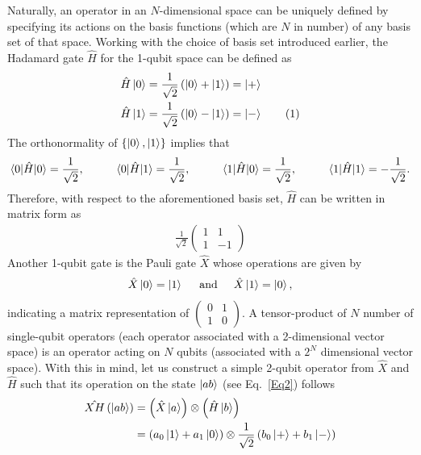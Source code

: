 \documentclass[12pt,oneside]{book}
\newcommand\numberthis{\addtocounter{equation}{1}\tag{\theequation}}
\begin{document}
Naturally, an operator in an $N$-dimensional space can be uniquely defined by specifying its actions on the basis functions (which are $N$ in number) of any basis set of that space. Working with the choice of basis set introduced earlier, the Hadamard gate $\hat{H}$ for the 1-qubit space can be defined as
\begin{align*}\label{Hadamard}
    \hat{H}\ket{0} &{}= \frac{1}{\sqrt{2}}\left(\ket{0}+\ket{1}\right) = \ket{+}\\
    \hat{H}\ket{1} &{}= \frac{1}{\sqrt{2}}\left(\ket{0}-\ket{1}\right) = \ket{-}\numberthis
\end{align*}
The orthonormality of $\{\ket{0},\ket{1}\}$ implies that
\begin{align*}
    \braket{0|\hat{H}|0}=\frac{1}{\sqrt{2}}, \hspace{1cm} \braket{0|\hat{H}|1}=\frac{1}{\sqrt{2}}, \hspace{1cm} \braket{1|\hat{H}|0}=\frac{1}{\sqrt{2}}, \hspace{1cm}
    \braket{1|\hat{H}|1}=-\frac{1}{\sqrt{2}}.
\end{align*}
Therefore, with respect to the aforementioned basis set, $\hat{H}$ can be written in matrix form as
\begin{align}
    \frac{1}{\sqrt{2}}\begin{pmatrix}
        1 & 1\\ 1 & -1
    \end{pmatrix}
\end{align}
Another 1-qubit gate is the Pauli gate $\hat{X}$ whose operations are given by
\begin{align*}
    \hat{X}\ket{0} = \ket{1} \hspace{0.5cm} \mathrm{and} \hspace{0.5cm} \hat{X}\ket{1}=\ket{0},
\end{align*}
indicating a matrix representation of $\begin{pmatrix}
    0 & 1\\ 1 & 0
\end{pmatrix}$.
A tensor-product of $N$ number of single-qubit operators (each operator associated with a 2-dimensional vector space) is an operator acting on $N$ qubits (associated with a $2^N$ dimensional vector space). With this in mind, let us construct a simple 2-qubit operator from $\hat{X}$ and $\hat{H}$ such that its operation on the state $\ket{ab}$ (see Eq.~\ref{Eq2}) follows
\begin{align}
\hat{XH}\left(\ket{ab}\right)&{}=\left(\hat{X}\ket{a}\right)\otimes\left(\hat{H}\ket{b}\right)\\
&{}=\left(a_0\ket{1}+a_1\ket{0}\right) \otimes \frac{1}{\sqrt{2}} \left(b_0\ket{+}+b_1\ket{-}\right)
\end{align}
\end{document}

